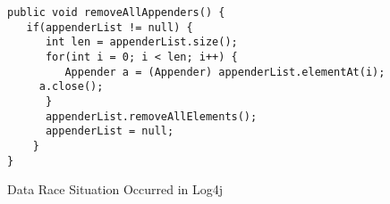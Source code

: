 \begin{figure}
    \begin{lstlisting}[style=Java-github]
public void removeAllAppenders() {
   if(appenderList != null) {
      int len = appenderList.size();
      for(int i = 0; i < len; i++) {
         Appender a = (Appender) appenderList.elementAt(i);
	 a.close();
      }
      appenderList.removeAllElements();
      appenderList = null;
    }
}
    \end{lstlisting}
    \caption{Data Race Situation Occurred in Log4j}
    \label{fig:code}
\end{figure}




